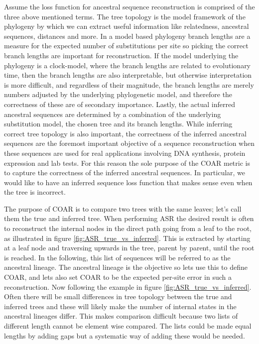 Assume the loss function for ancestral sequence reconstruction is comprised of the three above mentioned terms.
The tree topology is the model framework of the phylogeny by which we can extract useful information like relatedness, ancestral sequences, distances and more.
In a model based phylogeny branch lengths are a measure for the expected number of substitutions per site so picking the correct branch lengths are important for reconstruction.
If the model underlying the phylogeny is a clock-model, where the branch lengths are related to evolutionary time, then the branch lengths are also interpretable, but otherwise interpretation is more difficult, and regardless of their magnitude, the branch lengths are merely numbers adjusted by the underlying phylogenetic model, and therefore the correctness of these are of secondary importance.
Lastly, the actual inferred ancestral sequences are determined by a combination of the underlying substitution model, the chosen tree and its branch lengths.
While inferring correct tree topology is also important, the correctness of the inferred ancestral sequences are the foremost important objective of a sequence reconstruction when these sequences are used for real applications involving DNA synthesis, protein expression and lab tests.
For this reason the sole purpose of the COAR metric is to capture the correctness of the inferred ancestral sequences.
In particular, we would like to have an inferred sequence loss function that makes sense even when the tree is incorrect.

The purpose of COAR is to compare two trees with the same leaves; let's call them the true and inferred tree.
When performing ASR the desired result is often to reconstruct the internal nodes in the direct path going from a leaf to the root, as illustrated in figure \ref{fig:ASR_true_vs_inferred}.
This is extracted by starting at a leaf node and traversing upwards in the tree, parent by parent, until the root is reached.
In the following, this list of sequences will be referred to as the ancestral lineage.
The ancestral lineage is the objective so lets use this to define COAR, and lets also set COAR to be the expected per-site error in such a reconstruction.
Now following the example in figure \ref{fig:ASR_true_vs_inferred}.
Often there will be small differences in tree topology between the true and inferred trees and these will likely make the number of internal states in the ancestral lineages differ.
This makes comparison difficult because two lists of different length cannot be element wise compared.
The lists could be made equal lengths by adding gaps but a systematic way of adding these would be needed.

